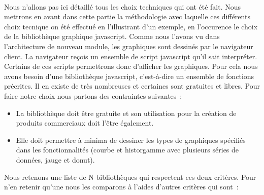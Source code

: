 			\paragraph{}%
			Nous n'allons pas ici détaillé tous les choix techniques qui ont été fait.
			Nous mettrons en avant dans cette partie la méthodologie avec laquelle ces
			différents choix tecnique on été effectué en l'illustrant d'un exemple, en
			l'occurence le choix de la bibliothèque graphique javascript. Comme nous
			l'avons vu dans l'architecture de nouveau module, les graphiques sont
			dessinés par le navigateur client. La navigateur reçois un ensemble de script
			javascript qu'il sait interpréter. Certains de ces scripts permettrons donc
			d'afficher les graphiques. Pour cela nous avons besoin d'une bibliothèque
			javascript, c'est-à-dire un ensemble de fonctions précrites. Il en existe de
			très nombreuses et certaines sont gratuites et libres. Pour faire notre choix
			nous partons des contraintes suivantes~:
			\begin{itemize}
			  \item La bibliothèque doit être gratuite et son utilisation pour la
			  création de produits commerciaux doit l'être également.
			  \item Elle doit permettre à minima de dessiner les types de graphiques
			  spécifiés dans les fonctionnalités (courbe et historgamme avec plusieurs
			  séries de données, jauge et donut).
			\end{itemize}
			Nous retenons une liste de N bibliothèques qui respectent ces deux critères.
			Pour n'en retenir qu'une nous les comparons à l'aides d'autres critères qui
			sont~:
